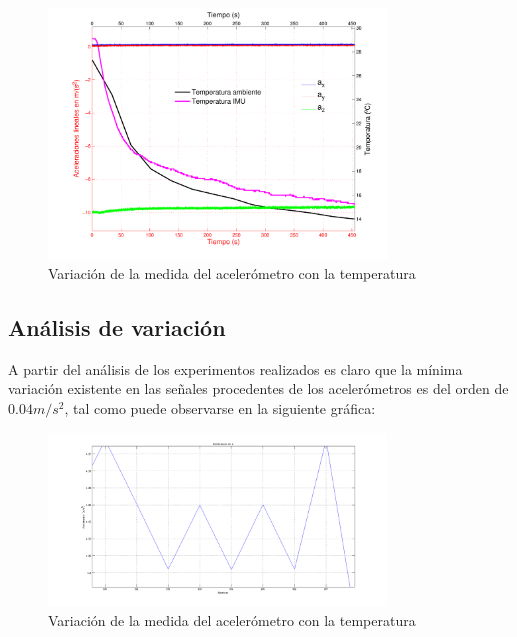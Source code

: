 \documentclass[spanish,12pt,a4paper,titlepage]{report}
\begin{document}
\begin{figure}[H]
  \begin{center}
    \includegraphics[width=0.8\textwidth]{./pics/bajada.pdf}
  \end{center}
  \vspace{-20pt}
  \caption{Variación de la medida del acelerómetro con la temperatura }
  \label{fig:bajada}
\end{figure}

\subsection{Análisis de variación}
A partir del análisis de los experimentos realizados es claro que la mínima variación existente en las señales procedentes de los acelerómetros es del orden de $0.04 m/s^2$, tal como puede observarse en la siguiente gráfica:

\begin{figure}[H]
  \begin{center}
    \includegraphics[width=0.8\textwidth]{./pics/variacion.png}
  \end{center}
  \vspace{-20pt}
  \caption{Variación de la medida del acelerómetro con la temperatura }
  \label{fig:variacion}
\end{figure}
\end{document}
